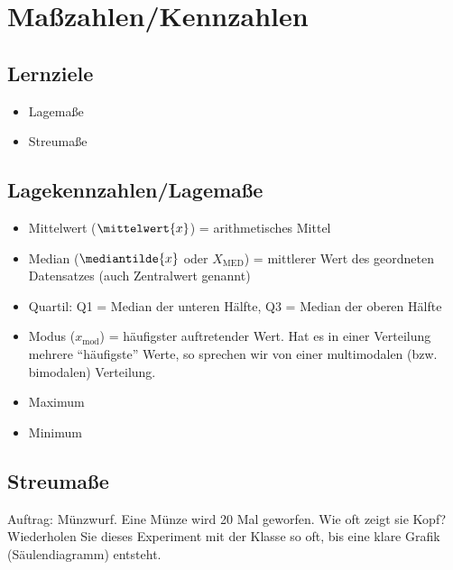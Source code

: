 
\section{Maßzahlen/Kennzahlen}

\subsection*{Lernziele}

\begin{itemize}
\item Lagemaße
\item Streumaße
\end{itemize}


\subsection{Lagekennzahlen/Lagemaße}
\begin{itemize}
\item Mittelwert ($\mittelwert{x}$) = arithmetisches Mittel
\item Median ($\mediantilde{x}$ oder $X_{\textrm{MED}}$) = mittlerer Wert des geordneten Datensatzes (auch Zentralwert genannt)
\item Quartil: Q1 = Median der unteren Hälfte, Q3 =
  Median der oberen Hälfte
\item Modus ($x_{\textrm{mod}}$) = häufigster auftretender Wert. Hat es in einer Verteilung mehrere ``häufigste'' Werte, so sprechen wir von einer multimodalen (bzw. bimodalen) Verteilung.
\item Maximum
\item Minimum
\end{itemize}
\newpage


\subsection{Streumaße}
Auftrag: Münzwurf. Eine Münze wird 20 Mal geworfen. Wie oft zeigt sie Kopf? Wiederholen Sie dieses Experiment mit der Klasse so oft, bis eine klare Grafik (Säulendiagramm) entsteht.


